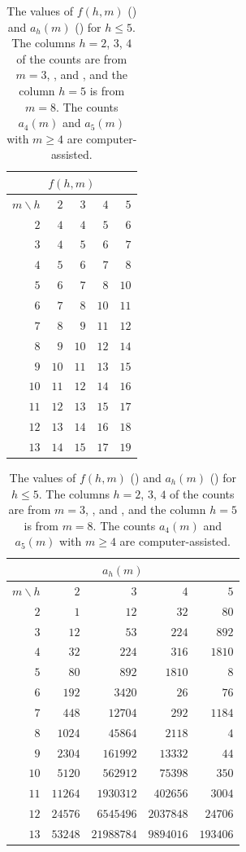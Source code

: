 \begin{table}[!htb]
\centering\footnotesize\setlength{\tabcolsep}{4pt}
\begin{tabular}{@{}r|rrrr@{}}
\multicolumn{5}{c}{$f(h,m)$}\\
\toprule
$m\backslash h$ & $2$ & $3$ & $4$ & $5$\\
\midrule
$2$ & $4$ & $4$ & $5$ & $6$\\
$3$ & $4$ & $5$ & $6$ & $7$\\
$4$ & $5$ & $6$ & $7$ & $8$\\
$5$ & $6$ & $7$ & $8$ & $10$\\
$6$ & $7$ & $8$ & $10$ & $11$\\
$7$ & $8$ & $9$ & $11$ & $12$\\
$8$ & $9$ & $10$ & $12$ & $14$\\
$9$ & $10$ & $11$ & $13$ & $15$\\
$10$ & $11$ & $12$ & $14$ & $16$\\
$11$ & $12$ & $13$ & $15$ & $17$\\
$12$ & $13$ & $14$ & $16$ & $18$\\
$13$ & $14$ & $15$ & $17$ & $19$\\
\bottomrule
\end{tabular}\hspace{1.2em}
\begin{tabular}{@{}r|rrrr@{}}
\multicolumn{5}{c}{$a_h(m)$}\\
\toprule
$m\backslash h$ & $2$ & $3$ & $4$ & $5$\\
\midrule
$2$ & $1$ & $12$ & $32$ & $80$\\
$3$ & $12$ & $53$ & $224$ & $892$\\
$4$ & $32$ & $224$ & $316$ & $1810$\\
$5$ & $80$ & $892$ & $1810$ & $8$\\
$6$ & $192$ & $3420$ & $26$ & $76$\\
$7$ & $448$ & $12704$ & $292$ & $1184$\\
$8$ & $1024$ & $45864$ & $2118$ & $4$\\
$9$ & $2304$ & $161992$ & $13332$ & $44$\\
$10$ & $5120$ & $562912$ & $75398$ & $350$\\
$11$ & $11264$ & $1930312$ & $402656$ & $3004$\\
$12$ & $24576$ & $6545496$ & $2037848$ & $24706$\\
$13$ & $53248$ & $21988784$ & $9894016$ & $193406$\\
\bottomrule
\end{tabular}
\caption{The values of $f(h,m)$ () and $a_h(m)$
() for $h\le5$. The columns $h=2$, $3$, $4$ of the counts are
 from $m=3$, , and , and the
column $h=5$ is  from $m=8$. The counts $a_4(m)$ and $a_5(m)$ with
$m\ge4$ are computer-assisted.}
\label{tab:values}
\end{table}
